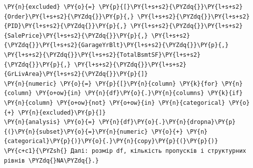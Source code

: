 \begin{Verbatim}[commandchars=\\\{\}]
\PY{n}{excluded} \PY{o}{=} \PY{p}{[}\PY{l+s+s2}{\PYZdq{}}\PY{l+s+s2}{Order}\PY{l+s+s2}{\PYZdq{}}\PY{p}{,} \PY{l+s+s2}{\PYZdq{}}\PY{l+s+s2}{PID}\PY{l+s+s2}{\PYZdq{}}\PY{p}{,} \PY{l+s+s2}{\PYZdq{}}\PY{l+s+s2}{SalePrice}\PY{l+s+s2}{\PYZdq{}}\PY{p}{,} \PY{l+s+s2}{\PYZdq{}}\PY{l+s+s2}{GarageYrBlt}\PY{l+s+s2}{\PYZdq{}}\PY{p}{,} \PY{l+s+s2}{\PYZdq{}}\PY{l+s+s2}{TotalBsmtSF}\PY{l+s+s2}{\PYZdq{}}\PY{p}{,} \PY{l+s+s2}{\PYZdq{}}\PY{l+s+s2}{GrLivArea}\PY{l+s+s2}{\PYZdq{}}\PY{p}{]}
\PY{n}{numeric} \PY{o}{=} \PY{p}{[}\PY{n}{column} \PY{k}{for} \PY{n}{column} \PY{o+ow}{in} \PY{n}{df}\PY{o}{.}\PY{n}{columns} \PY{k}{if} \PY{n}{column} \PY{o+ow}{not} \PY{o+ow}{in} \PY{n}{categorical} \PY{o}{+} \PY{n}{excluded}\PY{p}{]}
\PY{n}{analysis} \PY{o}{=} \PY{n}{df}\PY{o}{.}\PY{n}{dropna}\PY{p}{(}\PY{n}{subset}\PY{o}{=}\PY{n}{numeric} \PY{o}{+} \PY{n}{categorical}\PY{p}{)}\PY{o}{.}\PY{n}{copy}\PY{p}{(}\PY{p}{)}
\PY{c+c1}{\PYZsh{} Далі: розмір df, кількість пропусків і структурних рівнів \PYZdq{}NA\PYZdq{}.}
\end{Verbatim}
